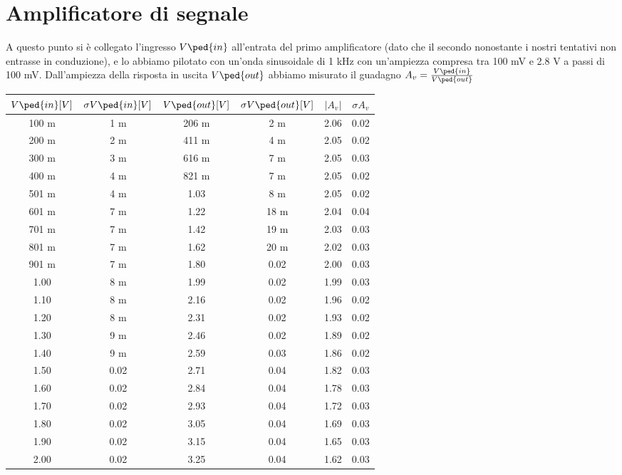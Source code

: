 \documentclass[10pt, a4paper, italian]{article}
\begin{document}
\section{Amplificatore di segnale}
A questo punto si è collegato l'ingresso $V\ped{in}$ all'entrata del primo amplificatore (dato che il secondo nonostante i nostri tentativi non entrasse in conduzione), e lo abbiamo pilotato con un'onda sinusoidale di 1 kHz con un'ampiezza compresa tra 100 mV e 2.8 V a passi di 100 mV. Dall'ampiezza della risposta in uscita $V\ped{out}$ abbiamo misurato il guadagno $A_v = \frac{V\ped{in}}{V\ped{out}}$
\begin{table}[H]
\centering
\begin{tabular}{cccccc}
\toprule
$V\ped{in} [V]$ & $\sigma V\ped{in}[V]$ & $V\ped{out} [V]$ & $\sigma V\ped{out} [V]$ & $|A_v|$ & $\sigma A_v$ \\
\midrule
\midrule
100 m & 1 m  & 206 m & 2 m   & 2.06 & 0.02 \\
200 m & 2 m  & 411 m & 4 m   & 2.05 & 0.02 \\
300 m & 3 m  & 616 m & 7 m  & 2.05 & 0.03 \\
400 m & 4 m  & 821 m & 7 m  & 2.05 & 0.02 \\
501 m & 4 m  & 1.03  & 8 m  & 2.05 & 0.02 \\
601 m & 7 m  & 1.22  & 18 m & 2.04 & 0.04 \\
701 m & 7 m  & 1.42  & 19 m & 2.03 & 0.03 \\
801 m & 7 m  & 1.62  & 20 m & 2.02 & 0.03 \\
901 m & 7 m  & 1.80  & 0.02 & 2.00 & 0.03 \\
1.00  & 8 m  & 1.99  & 0.02 & 1.99 & 0.03 \\
1.10  & 8 m  & 2.16  & 0.02 & 1.96 & 0.02 \\
1.20  & 8 m  & 2.31  & 0.02 & 1.93 & 0.02 \\
1.30  & 9 m  & 2.46  & 0.02 & 1.89 & 0.02 \\
1.40  & 9 m  & 2.59  & 0.03 & 1.86 & 0.02 \\
1.50  & 0.02 & 2.71  & 0.04 & 1.82 & 0.03 \\
1.60  & 0.02 & 2.84  & 0.04 & 1.78 & 0.03 \\
1.70  & 0.02 & 2.93  & 0.04 & 1.72 & 0.03 \\
1.80  & 0.02 & 3.05  & 0.04 & 1.69 & 0.03 \\
1.90  & 0.02 & 3.15  & 0.04 & 1.65 & 0.03 \\
2.00  & 0.02 & 3.25  & 0.04 & 1.62 & 0.03 \\

\end{tabular}
\end{table}
\end{document}
